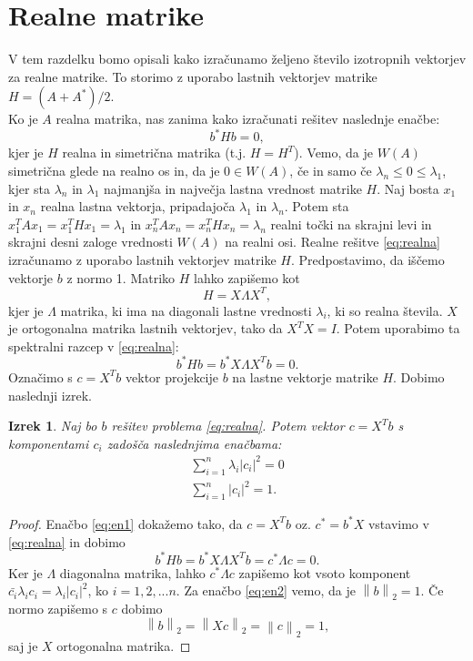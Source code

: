 \documentclass[12pt,a4paper]{amsart}
\theoremstyle{definition}
\theoremstyle{plain}
\newtheorem{izrek}[definicija]{Izrek}
\newcommand{\abs}[1]{ \left\lvert#1\right\rvert}
\newcommand{\norm}[1]{\left\lVert#1\right\rVert}
\begin{document}
\section{Realne matrike}
V tem razdelku bomo opisali kako izračunamo željeno število izotropnih vektorjev za realne matrike. To storimo z uporabo lastnih vektorjev matrike $H=(A+A^\ast)/2$.\\
Ko je $A$ realna matrika, nas zanima kako izračunati rešitev naslednje enačbe:
\begin{equation}\label{eq:realna}
b^\ast Hb=0,
\end{equation}
kjer je $H$ realna in simetrična matrika (t.j. $H=H^T$). Vemo, da  je $W(A)$ simetrična glede na realno os in, da je $0 \in W(A)$, če in samo če $\lambda_n\le0\le\lambda_1$, kjer sta $\lambda_n$ in $\lambda_1$ najmanjša in največja lastna vrednost matrike $H$. Naj bosta $x_1$ in $x_n$ realna lastna vektorja, pripadajoča $\lambda_1$ in $\lambda_n$.  Potem sta $x_1^T Ax_1=x_1^T Hx_1=\lambda_1$ in $x_n^T Ax_n=x_n^T Hx_n=\lambda_n$ realni točki na skrajni levi in skrajni desni zaloge vrednosti $W(A)$ na realni osi.
Realne rešitve \eqref{eq:realna} izračunamo z uporabo lastnih vektorjev matrike $H$. Predpostavimo, da iščemo vektorje $b$ z normo 1. Matriko $H$ lahko zapišemo kot $$H=X\Lambda X^T,$$ kjer je $\Lambda$ matrika, ki ima na diagonali lastne vrednosti $\lambda_i$, ki so realna števila. $X$ je ortogonalna matrika lastnih vektorjev, tako da $X^T X=I$. Potem uporabimo ta spektralni razcep v \eqref{eq:realna}: $$b^\ast Hb=b^\ast X\Lambda X^T b=0.$$ Označimo s $c=X^Tb$ vektor projekcije $b$ na lastne vektorje matrike $H$. Dobimo naslednji izrek.
\begin{izrek} \label{izrek2}
Naj bo $b$ rešitev problema \eqref{eq:realna}. Potem vektor $c=X^T b$ s komponentami $c_i$ zadošča naslednjima enačbama:
\begin{align}
\sum_{i=1}^{n} \lambda_i \abs{c_i}^2=0 \label{eq:en1}\\
\sum_{i=1}^{n}\abs{c_i}^2=1. \label{eq:en2}
\end{align}
\end{izrek}
\begin{proof}
Enačbo \eqref{eq:en1}  dokažemo tako, da $c=X^Tb$ oz. $c^\ast =b^\ast X$ vstavimo v \eqref{eq:realna} in dobimo $$b^\ast Hb=b^\ast X\Lambda X^T b= c^\ast \Lambda c=0.$$ Ker je $\Lambda$ diagonalna matrika, lahko $c^\ast \Lambda c$ zapišemo kot vsoto komponent $\bar{c_i}\lambda_i c_i=\lambda_i\abs{c_i}^2$, ko $i=1,2,...n$.
Za enačbo \eqref{eq:en2} vemo, da je $\norm{b}_2=1$. Če normo zapišemo s $c$ dobimo $$\norm{b}_2=\norm{Xc}_2=\norm{c}_2=1,$$ saj je $X$ ortogonalna matrika.

\end{proof}
\end{document}
